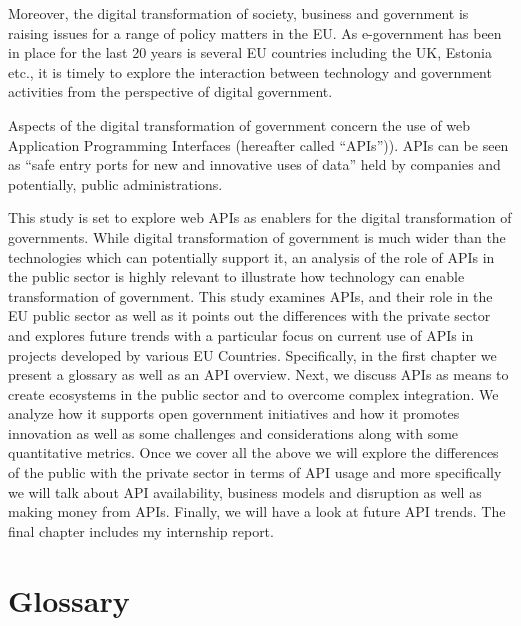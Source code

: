 Moreover, the digital transformation of society, business and government is raising
issues for a range of policy matters in the EU. As e-government has
been in place for the last 20 years is several EU countries including the UK, Estonia etc.,
it is timely to explore the interaction between
technology and government activities from the perspective of digital government.

Aspects of the digital
transformation of government concern the use of web Application Programming Interfaces
(hereafter called “APIs”)). APIs can be seen as “safe entry ports for new and
innovative uses of data” held by companies and potentially, public administrations.

This study is set to explore
web APIs as enablers for the digital transformation of governments. While
digital transformation of government is much wider than the technologies which
can potentially support it, an analysis of the role of APIs in the public sector
is highly relevant to illustrate how technology can enable transformation of
government. This study examines APIs, and their role in the EU public sector as
well as it points out the differences with the private sector and explores future
trends with a particular focus on current use of APIs in projects developed by various
EU Countries. Specifically, in the first chapter we present a glossary as well as an API
overview. Next, we discuss APIs as means to create ecosystems in the public sector and
to overcome complex integration. We analyze how it supports open government initiatives and
how it promotes innovation as well as some challenges and considerations along with some
quantitative metrics. Once we cover all the above we will explore the differences of the public 
with the private sector in terms of API usage and more specifically we will talk about API availability, business models and disruption as well as making money from APIs. Finally,
we will have a look at future API trends. The final chapter includes my internship report.

\clearpage

\section{Glossary} %

